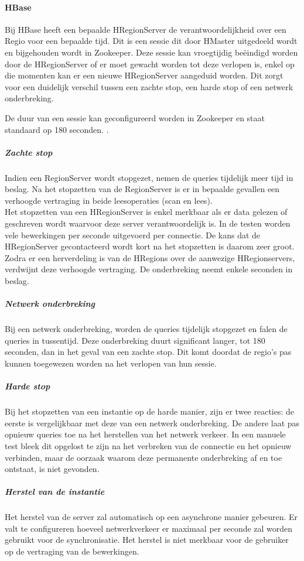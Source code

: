 \paragraph{HBase} Bij HBase heeft een bepaalde HRegionServer de verantwoordelijkheid over een Regio voor een bepaalde tijd. Dit is een sessie dit door HMaster uitgedeeld wordt en bijgehouden wordt in Zookeeper. Deze sessie kan vroegtijdig beëindigd worden door de HRegionServer of er moet gewacht worden tot deze verlopen is, enkel op die momenten kan er een nieuwe HRegionServer aangeduid worden. Dit zorgt voor een duidelijk verschil tussen een zachte stop, een harde stop of een netwerk onderbreking. 

De duur van een sessie kan geconfigureerd worden in Zookeeper en staat standaard op 180 seconden. \cite{hbase-doc}. 

\subparagraph{Zachte stop} Indien een RegionServer wordt stopgezet, nemen de queries tijdelijk meer tijd in beslag. Na het stopzetten van de RegionServer is er in bepaalde gevallen een verhoogde vertraging in beide leesoperaties (scan en lees). \\ 
Het stopzetten van een HRegionServer is enkel merkbaar als er data gelezen of geschreven wordt waarvoor deze server verantwoordelijk is. In de testen worden vele bewerkingen per seconde uitgevoerd per connectie. De kans dat de HRegionServer gecontacteerd wordt kort na het stopzetten is daarom zeer groot. \\
Zodra er een herverdeling is van de HRegions over de aanwezige HRegionservers, verdwijnt deze verhoogde vertraging. De onderbreking neemt enkele seconden in beslag. 

\subparagraph{Netwerk onderbreking} Bij een netwerk onderbreking, worden de queries tijdelijk stopgezet en falen de queries in tussentijd. Deze onderbreking duurt significant langer, tot 180 seconden, dan in het geval van een zachte stop. Dit komt doordat de regio's pas kunnen toegewezen worden na het verlopen van hun sessie.  

\subparagraph{Harde stop} Bij het stopzetten van een instantie op de harde manier, zijn er twee reacties: de eerste is vergelijkbaar met deze van een netwerk onderbreking. De andere laat pas opnieuw queries toe na het herstellen van het netwerk verkeer. In een manuele test bleek dit opgelost te zijn na het verbreken van de connectie en het opnieuw verbinden, maar de oorzaak waarom deze permanente onderbreking af en toe ontstaat, is niet gevonden. 

\subparagraph{Herstel van de instantie} Het herstel van de server zal automatisch op een asynchrone manier gebeuren. Er valt te configureren hoeveel netwerkverkeer er maximaal per seconde zal worden gebruikt voor de synchronisatie. Het herstel is niet merkbaar voor de gebruiker op de vertraging van de bewerkingen. 

